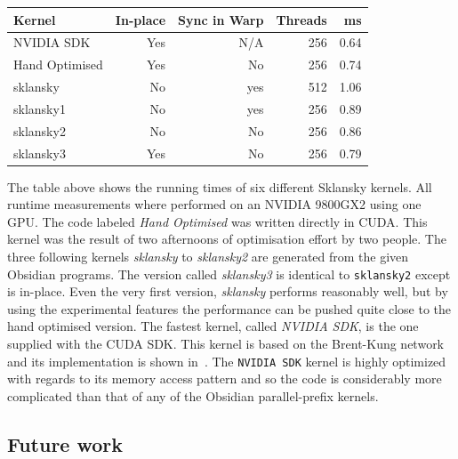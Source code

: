 \begin{small}
\begin{center}
  \begin{tabular}{  l | r | r |r | r  }
    Kernel          & In-place & Sync in Warp & Threads & ms   \\ \hline
    NVIDIA SDK      & Yes      & N/A          & 256     & 0.64 \\
    Hand Optimised  & Yes      & No           & 256     & 0.74 \\ 
    sklansky        & No       & yes          & 512     & 1.06 \\ 
    sklansky1       & No       & yes          & 256     & 0.89 \\ 
    sklansky2       & No       & No           & 256     & 0.86 \\ 
    sklansky3       & Yes      & No           & 256     & 0.79 \\
  \end{tabular}
\end{center}
\end{small}

The table above shows the running times of six different Sklansky kernels. 
All runtime measurements where performed on an NVIDIA 9800GX2 using one GPU. 
The code labeled {\em Hand Optimised} was written directly in CUDA. 
This kernel was the result of two afternoons of optimisation effort by 
two people. The three following kernels {\em sklansky} to {\em sklansky2} are 
generated from the given Obsidian programs. The version called {\em sklansky3} 
is identical to {\tt sklansky2} except is in-place. Even the very first version, 
{\em sklansky} performs reasonably well, but by using the experimental features 
the performance can be pushed quite close to the hand optimised version.  
The fastest kernel, called {\em NVIDIA SDK}, is the one supplied 
with the CUDA SDK. This kernel is based on the Brent-Kung network and its 
implementation is shown in~. The {\tt NVIDIA SDK} 
kernel is highly optimized with regards to its memory access pattern and 
so the code is considerably more complicated than that of any of the Obsidian parallel-prefix kernels.
 

\FloatBarrier
\subsection{Future work}

